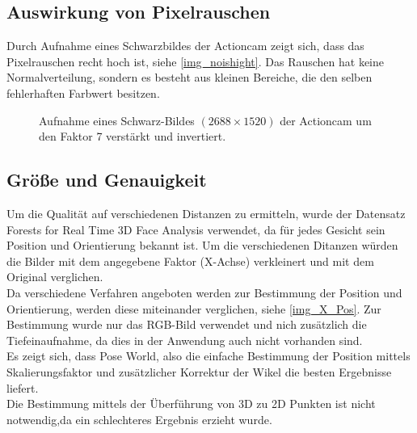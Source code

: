 \subsection{Auswirkung von Pixelrauschen}
Durch Aufnahme eines Schwarzbildes der Actioncam zeigt sich, dass das Pixelrauschen recht hoch ist, siehe \autoref{img_noishight}. Das Rauschen hat keine Normalverteilung, sondern es besteht aus kleinen Bereiche, die den selben fehlerhaften Farbwert besitzen.
\begin{figure}
	\centering
	\caption{Aufnahme eines Schwarz-Bildes $(2688\times 1520)$ der Actioncam um den Faktor 7 verstärkt und invertiert.}
	\label{img_noishight}
\end{figure}
\subsection{Größe und Genauigkeit}
Um die Qualität auf verschiedenen Distanzen zu ermitteln, wurde der Datensatz Forests for Real Time 3D Face Analysis \cite{database_Face_Ori} verwendet, da für jedes Gesicht sein Position und Orientierung bekannt ist. Um die verschiedenen Ditanzen würden die Bilder mit dem angegebene Faktor (X-Achse) verkleinert und mit dem Original verglichen.\\
Da verschiedene Verfahren angeboten werden zur Bestimmung der Position und Orientierung, werden diese miteinander verglichen, siehe \autoref{img_X_Pos}. Zur Bestimmung wurde nur das RGB-Bild verwendet und nich zusätzlich die Tiefeinaufnahme, da dies in der Anwendung auch nicht vorhanden sind.\\
Es zeigt sich, dass Pose World, also die einfache Bestimmung der Position mittels Skalierungsfaktor und zusätzlicher Korrektur der Wikel die besten Ergebnisse liefert.\\
Die Bestimmung mittels der Überführung von 3D zu 2D Punkten ist nicht notwendig,da ein schlechteres Ergebnis erzieht wurde.
